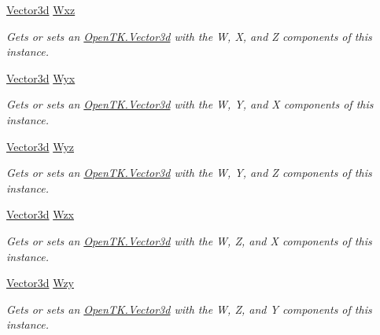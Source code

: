 \begin{DoxyCompactItemize}
\hyperlink{struct_open_t_k_1_1_vector3d}{Vector3d} \hyperlink{struct_open_t_k_1_1_vector4d_aec7991cece26db42819179ed030e0714}{Wxz}
\begin{DoxyCompactList}\small\item\em Gets or sets an \hyperlink{struct_open_t_k_1_1_vector3d}{Open\-T\-K.\-Vector3d} with the W, X, and Z components of this instance. \end{DoxyCompactList}\item 
\hyperlink{struct_open_t_k_1_1_vector3d}{Vector3d} \hyperlink{struct_open_t_k_1_1_vector4d_a54fa95a36d8f0f19fb27fd8ccea96e56}{Wyx}
\begin{DoxyCompactList}\small\item\em Gets or sets an \hyperlink{struct_open_t_k_1_1_vector3d}{Open\-T\-K.\-Vector3d} with the W, Y, and X components of this instance. \end{DoxyCompactList}\item 
\hyperlink{struct_open_t_k_1_1_vector3d}{Vector3d} \hyperlink{struct_open_t_k_1_1_vector4d_acb47d15e462f5992e0f3980aa3217f41}{Wyz}
\begin{DoxyCompactList}\small\item\em Gets or sets an \hyperlink{struct_open_t_k_1_1_vector3d}{Open\-T\-K.\-Vector3d} with the W, Y, and Z components of this instance. \end{DoxyCompactList}\item 
\hyperlink{struct_open_t_k_1_1_vector3d}{Vector3d} \hyperlink{struct_open_t_k_1_1_vector4d_ab4176efafa4585535b7285b0f6e6ed90}{Wzx}
\begin{DoxyCompactList}\small\item\em Gets or sets an \hyperlink{struct_open_t_k_1_1_vector3d}{Open\-T\-K.\-Vector3d} with the W, Z, and X components of this instance. \end{DoxyCompactList}\item 
\hyperlink{struct_open_t_k_1_1_vector3d}{Vector3d} \hyperlink{struct_open_t_k_1_1_vector4d_a3bac109c103b2c6a92b3af68286f8356}{Wzy}
\begin{DoxyCompactList}\small\item\em Gets or sets an \hyperlink{struct_open_t_k_1_1_vector3d}{Open\-T\-K.\-Vector3d} with the W, Z, and Y components of this instance. \end{DoxyCompactList}\item 

\end{DoxyCompactItemize}
